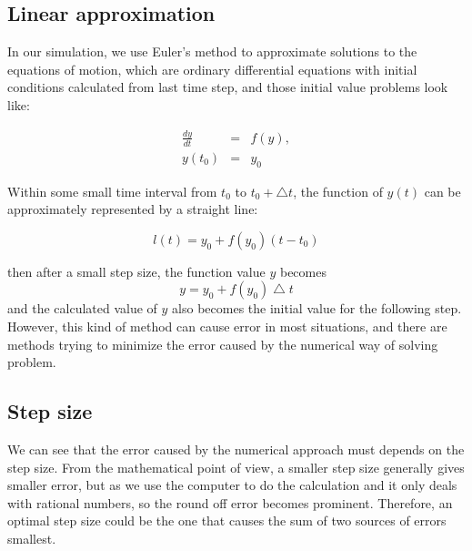 \documentclass[10pt,a4paper]{article}
\begin{document}
\subsection*{Linear approximation}
In our simulation, we use Euler's method to approximate solutions to the equations of motion, which are ordinary differential equations with initial conditions calculated from last time step, and those initial value problems look like:

\begin{eqnarray}
\frac{dy}{dt} &=& f(y),\\
y(t_{0}) &=& y_{0}
\end{eqnarray}

Within some small time interval from $t_{0}$ to $t_{0}+\bigtriangleup t$, the function of $ y(t) $ can be approximately represented by a straight line:

\begin{equation}
l(t) = y_{0} + f(y_{0}) (t-t_{0})
\end{equation}

then after a small step size, the function value $ y $ becomes
\begin{equation}
y = y_{0} + f(y_{0}) \bigtriangleup t
\end{equation}
and the calculated value of $ y $ also becomes the initial value for the following step. However, this kind of method can cause error in most situations, and there are methods trying to minimize the error caused by the numerical way of solving problem.

\subsection*{Step size}
We can see that the error caused by the numerical approach must depends on the step size.  From the mathematical point of view, a smaller step size generally gives smaller error, but as we use the computer to do the calculation and it only deals with rational numbers, so the round off error becomes prominent. Therefore, an optimal step size could be the one that causes the sum of two sources of errors smallest.
\end{document}
